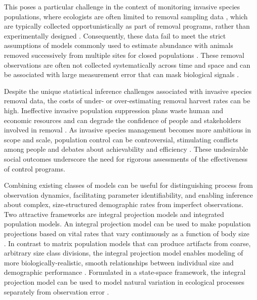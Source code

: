 \documentclass{article}
\begin{document}
This poses a particular challenge in the context of monitoring invasive species populations, where ecologists are often limited to removal sampling data \parencite{udell2022open}, which are typically collected opportunistically as part of removal programs, rather than experimentally designed \parencite{tiberti2021alien, crall2010improving, rogosch2021comparing}. Consequently, these data fail to meet the strict assumptions of models commonly used to estimate abundance with animals removed successively from multiple sites for closed populations \parencite{dorazio2005improving}. These removal observations are often not collected systematically across time and space and can be associated with large measurement error that can mask biological signals \parencite{auger2016state, sibert2003horizontal, katsanevakis2012monitoring}.

Despite the unique statistical inference challenges associated with invasive species removal data, the costs of under- or over-estimating removal harvest rates can be high. Ineffective invasive population suppression plans waste human and economic resources and can degrade the confidence of people and stakeholders involved in removal \parencite{tiberti2021alien}. As invasive species management becomes more ambitious in scope and scale, population control can be controversial, stimulating conflicts among people and debates about achievability and efficiency \parencite{crowley2017conflict}. These undesirable social outcomes underscore the need for rigorous assessments of the effectiveness of control programs.

Combining existing classes of models can be useful for distinguishing process from observation dynamics, facilitating parameter identifiability, and enabling inference about complex, size-structured demographic rates from imperfect observations. Two attractive frameworks are integral projection models and integrated population models. An integral projection model can be used to make population projections based on vital rates that vary continuously as a function of body size \parencite{merow2014advancing, rees2014building}. In contrast to matrix population models that can produce artifacts from coarse, arbitrary size class divisions, the integral projection model enables modeling of more biologically-realistic, smooth relationships between individual size and demographic performance \parencite{ellner2006integral}. Formulated in a state-space framework, the integral projection model can be used to model natural variation in ecological processes separately from observation error \parencite{auger2021guide, white2016fitting}. 
\end{document}
